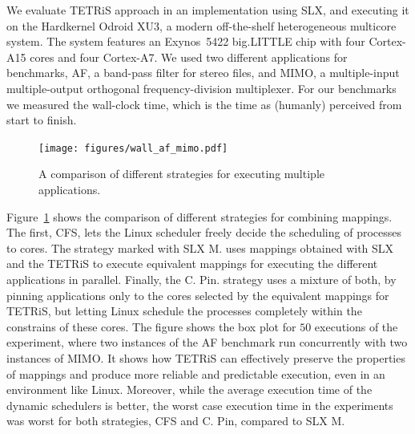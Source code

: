 \documentclass[sigplan,10pt]{acmart}
\begin{document}
We evaluate TETRiS approach in an implementation using SLX, and executing it on the Hardkernel Odroid XU3, a modern off-the-shelf heterogeneous multicore system.
The system features an Exynos~5422 big.LITTLE chip with four Cortex-A15 cores and four Cortex-A7. 
We used two different applications for benchmarks, AF, a band-pass filter for stereo files, and MIMO, a multiple-input multiple-output orthogonal frequency-division multiplexer.
For our benchmarks we measured the wall-clock time, which is the time as (humanly) perceived from start to finish.

 \begin{figure}
 	\centering
 	\texttt{[image: figures/wall\_af\_mimo.pdf]} 
 	\caption{A comparison of different strategies for executing multiple applications.}
 	\label{fig:tetris_eval}
 		\vspace{-3mm}
 \end{figure}

Figure~\ref{fig:tetris_eval} shows the comparison of different strategies for combining mappings. The first, CFS, lets the Linux scheduler freely decide the scheduling of processes to cores. 
The strategy marked with SLX M. uses mappings obtained with SLX and the TETRiS to execute equivalent mappings for executing the different applications in parallel. 
Finally, the C. Pin. strategy uses a mixture of both, by pinning applications only to the cores selected by the equivalent mappings for TETRiS, but letting Linux schedule the processes completely within the constrains of these cores.
The figure shows the box plot for $50$ executions of the experiment, where two instances of the AF benchmark run concurrently with two instances of MIMO. 
It shows how TETRiS can effectively preserve the properties of mappings and produce more reliable and predictable execution, even in an environment like Linux.
Moreover, while the average execution time of the dynamic schedulers is better, the worst case execution time in the experiments was worst for both strategies, CFS and C. Pin, compared to SLX M. 
\end{document}
